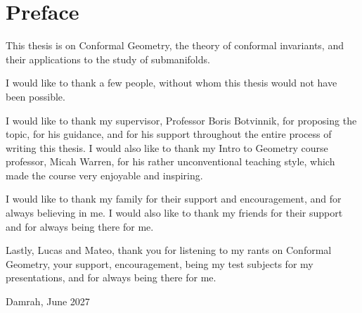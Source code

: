 \chapter*{Preface}
\label{ch:preface}

This thesis is on Conformal Geometry, the theory of conformal invariants, and their applications to the study of submanifolds.

I would like to thank a few people, without whom this thesis would not have been possible.

I would like to thank my supervisor, Professor Boris Botvinnik, for proposing the topic, for his guidance, and for his support throughout the entire process of writing this thesis. I would also like to thank my Intro to Geometry course professor, Micah Warren, for his rather unconventional teaching style, which made the course very enjoyable and inspiring.

I would like to thank my family for their support and encouragement, and for always believing in me. I would also like to thank my friends for their support and for always being there for me.

Lastly, Lucas and Mateo, thank you for listening to my rants on Conformal Geometry, your support, encouragement, being my test subjects for my presentations, and for always being there for me.

\hfill Damrah, June 2027
